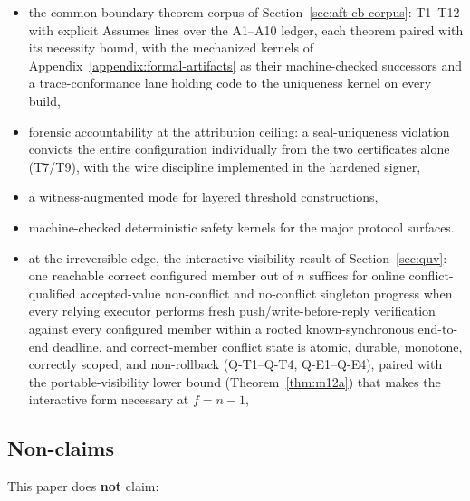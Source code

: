 \documentclass[11pt]{article}
\begin{document}
\begin{itemize}[leftmargin=1.5em]
certificates alone,
\item the common-boundary theorem corpus of
Section~\ref{sec:aft-cb-corpus}: T1--T12 with explicit Assumes lines over
the A1--A10 ledger, each theorem paired with its necessity bound, with the
mechanized kernels of Appendix~\ref{appendix:formal-artifacts} as their
machine-checked successors and a trace-conformance lane holding code to
the uniqueness kernel on every build,
\item forensic accountability at the attribution ceiling: a
seal-uniqueness violation convicts the entire configuration individually
from the two certificates alone (T7/T9), with the wire discipline
implemented in the hardened signer,
\item a witness-augmented mode for layered threshold constructions,
\item machine-checked deterministic safety kernels for the major protocol
surfaces.
\item at the irreversible edge, the interactive-visibility result of
Section~\ref{sec:quv}: one reachable correct configured member out of
\(n\) suffices for online conflict-qualified accepted-value non-conflict
and no-conflict singleton progress when every relying executor performs
fresh push/write-before-reply verification against every configured
member within a rooted known-synchronous end-to-end deadline, and
correct-member conflict state is atomic, durable, monotone, correctly
scoped, and non-rollback (Q-T1--Q-T4, Q-E1--Q-E4), paired with the
portable-visibility lower bound (Theorem~\ref{thm:m12a}) that makes the
interactive form necessary at \(f = n-1\),
\end{itemize}

\subsection{Non-claims}

This paper does \textbf{not} claim:
\end{document}
